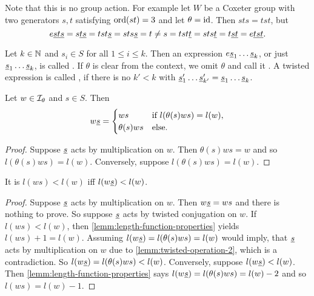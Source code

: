 Note that this is no group action. For example let $W$ be a Coxeter group with two generators $s,t$ satisfying $\operatorname{ord}(st) = 3$ and let $\theta = \operatorname{id}$. Then $sts = tst$, but
$$ e \underline{s} \underline{t} \underline{s} = s \underline{t} \underline{s} = tst \underline{s} = sts \underline{s} = t \neq s = tst \underline{t} = sts \underline{t} = t \underline{s} \underline{t} = e \underline{t} \underline{s} \underline{t}. $$

\begin{defi}
	Let $k \in \mathbb{N}$ and $s_{i} \in S$ for all $1 \leq i \leq k$. Then an expression $e \underline{s}_1 \ldots \underline{s}_k$, or just $\underline{s}_1 \ldots \underline{s}_k$, is called . If $\theta$ is clear from the context, we omit $\theta$ and call it . A twisted expression is called , if there is no $k' < k$ with $\underline{s}'_1 \ldots \underline{s}'_{k'} = \underline{s}_1 \ldots \underline{s}_k$.
\end{defi}

\begin{lemm}
	Let $w \in \mathcal{I}_{\theta}$ and $s \in S$. Then
	$$ w \underline{s} = \begin{cases}
		ws & \textrm{if } l(\theta(s)ws) = l(w), \\
		\theta(s)ws & \textrm{else}. \\
	\end{cases} $$

	\begin{proof}
		Suppose $\underline{s}$ acts by multiplication on $w$. Then $\theta(s)ws = w$ and so $l(\theta(s)ws) = l(w)$. Conversely, suppose $l(\theta(s)ws) = l(w)$. \todo
	\end{proof}
\end{lemm}

\begin{lemm}
	It is $l(ws) < l(w)$ iff $l(w \underline{s}) < l(w)$.

	\begin{proof}
		Suppose $\underline{s}$ acts by multiplication on $w$. Then $w \underline{s} = ws$ and there is nothing to prove. So suppose $\underline{s}$ acts by twisted conjugation on $w$. If $l(ws) < l(w)$, then \ref{lemm:length-function-properties} yields $l(ws) + 1 = l(w)$. Assuming $l(w \underline{s}) = l(\theta(s)ws) = l(w)$ would imply, that $\underline{s}$ acts by multiplication on $w$ due to \ref{lemm:twisted-operation-2}, which is a contradiction. So $l(w \underline{s}) = l(\theta(s)ws) < l(w)$. Conversely, suppose $l(w \underline{s}) < l(w)$. Then \ref{lemm:length-function-properties} says $l(w \underline{s}) = l(\theta(s)ws) = l(w) - 2$ and so $l(ws) = l(w) - 1$.
	\end{proof}
\end{lemm}

